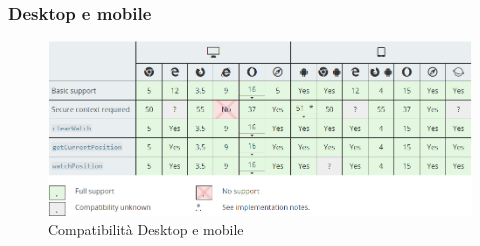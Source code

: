 \documentclass[11pt ,a4paper , twoside , openright ]{article}
\begin{document}
\subsubsection{Desktop e mobile}
\begin{figure}[h]
	\centering
	\includegraphics[width=1\linewidth]{compatibility}
	\caption{Compatibilità Desktop e mobile}
	\label{fig: Compatibilità Desktop e mobile}
\end{figure}
\end{document}
